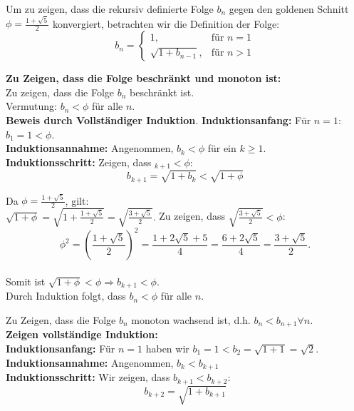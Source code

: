 \documentclass{beamer}
\begin{document}
\begin{frame}
 Um zu zeigen, dass die rekursiv definierte Folge $ b_n $ gegen den goldenen Schnitt $\phi = \frac{1 + \sqrt{5}}{2}$ konvergiert, betrachten wir die Definition der Folge:
$$
b_n = \begin{cases} 
1, & \text{für } n = 1 \\ 
\sqrt{1 + b_{n-1}}, & \text{für } n > 1 
\end{cases}
$$
\end{frame}

\begin{frame}
\textbf{Zu Zeigen, dass die Folge beschränkt und monoton ist:} \\
Zu zeigen, dass die Folge $ b_n$ beschränkt ist.  
\\ Vermutung: $ b_n < \phi $ für alle $ n $. \\
\textbf{Beweis durch Vollständiger Induktion}. 
\textbf{Induktionsanfang:} Für $ n = 1$: $ b_1 = 1 < \phi $. \\
\textbf{Induktionsannahme:} Angenommen, $ b_k < \phi $ für ein $ k \geq 1 .$ \\   
\textbf{Induktionsschritt:} Zeigen, dass $_{k+1} < \phi $:
$$
b_{k+1} = \sqrt{1 + b_k} < \sqrt{1 + \phi}
$$
\end{frame}

\begin{frame}
Da $ \phi = \frac{1 + \sqrt{5}}{2} $, gilt: \\
$
\sqrt{1 + \phi} = \sqrt{1 + \frac{1 + \sqrt{5}}{2}} = \sqrt{\frac{3 + \sqrt{5}}{2}}.
$
Zu zeigen, dass $\sqrt{\frac{3 + \sqrt{5}}{2}} < \phi $: \\

$$
\phi^2 = \left(\frac{1 + \sqrt{5}}{2}\right)^2 = \frac{1 + 2\sqrt{5} + 5}{4} = \frac{6 + 2\sqrt{5}}{4} = \frac{3 + \sqrt{5}}{2}.
$$ \\

Somit ist $ \sqrt{1 + \phi} < \phi \Rightarrow b_{k+1} < \phi $. \\

Durch Induktion folgt, dass $ b_n < \phi $ für alle $ n $. \\
\end{frame}

\begin{frame}
    Zu Zeigen, dass die Folge $ b_n $ monoton wachsend ist, d.h. $ b_n < b_{n+1} \forall n $. \\ 
    \textbf{Zeigen vollständige Induktion:} \\
    \textbf{Induktionsanfang:} Für $n = 1$ haben wir $ b_1 = 1 < b_2 = \sqrt{1 + 1} = \sqrt{2} .$ \\

\textbf{Induktionsannahme:} Angenommen, $ b_k < b_{k+1} $ \\

\textbf{Induktionsschritt:} Wir zeigen, dass $b_{k+1} < b_{k+2} :$ \\ 
$$
b_{k+2} = \sqrt{1 + b_{k+1}}
$$    
\end{frame}
\end{document}
